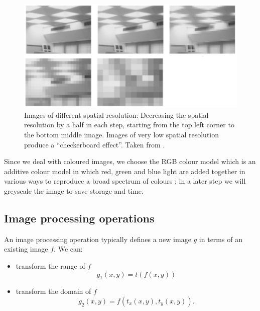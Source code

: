 \begin{figure}[H]
	\centering
	\includegraphics[width=\textwidth]{../Figures/checkerboard.png}
	\caption{Images of different spatial resolution: Decreasing the spatial resolution by a half in each step, starting from the top left corner to the bottom middle image. Images of very low spatial resolution produce a “checkerboard effect”.
	Taken from \cite{imagProcFundamentals}.}
	\label{fig:checkerboardEffect}
\end{figure}

%

Since we deal with coloured images, we choose the RGB colour model which is an additive colour model in which red, green and blue light are added together in various ways to reproduce a broad spectrum of colours \cite{ibraheem2012understanding}; in a later step we will greyscale the image to save storage and time.


\subsection{Image processing operations}

An image processing operation typically defines a new image \( g \) in terms of an existing image \( f \).
We can: 
\begin{itemize}
	\item transform the range of \( f \)
	\[ 
	g_{1}(x, y) = t(f(x,y)) 
	\]
	\item transform the domain of \( f \)
	\[
	g_{2}(x,y) = f(t_{x}(x,y), t_{y}(x,y)).
	\]
\end{itemize}

